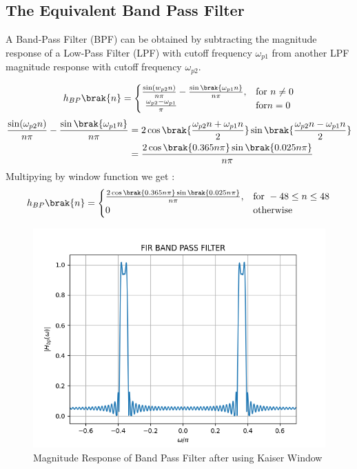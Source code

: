 \documentclass{article}
\begin{document}
\subsection{The Equivalent Band Pass Filter}
A Band-Pass Filter (BPF) can be obtained by subtracting the magnitude response of a Low-Pass Filter (LPF) with cutoff frequency $\omega_{p1}$ from another LPF magnitude response with cutoff frequency $\omega_{p2}$.

\begin{align}
    h_{BP}\brak{n} = 
\begin{cases} 
    \frac{\sin(w_{p2} n)}{n\pi} -\frac{\sin\brak{\omega_{p1}n}}{n\pi},  & \text{for } n\neq 0\\\
    \frac{\omega_{p2}-\omega_{p1}}{\pi} &\text{for} n= 0
\end{cases} \label{eq:h(n)desired_for_LPF}
\end{align}
\begin{align}
     \frac{\sin(\omega_{p2} n)}{n\pi} -\frac{\sin\brak{\omega_{p1}n}}{n\pi} &= 2\cos{\brak{\frac{\omega_{p2}n+\omega_{p1}n}{2}}}\sin{\brak{\frac{\omega_{p2}n-\omega_{p1}n}{2}}}\\
            &= \frac{2\cos{\brak{0.365n\pi}}\sin{\brak{0.025n\pi}}}{n\pi}
\end{align}
Multipying by window function we get :
\begin{align}
    h_{BP}\brak{n} = 
\begin{cases} 
   \frac{2\cos{\brak{0.365n\pi}}\sin{\brak{0.025n\pi}}}{n\pi},  & \text{for } -48\leq n \leq 48 \\
    0 &\text{otherwise}
\end{cases} \label{eq:h(n)desired_for_LPF}
\end{align}

\begin{figure}[H]
\centering
\includegraphics[width=1\columnwidth]{figs/FIR_Bandpass_Filter.png}
\caption{Magnitude Response of Band Pass Filter after using Kaiser Window}
\label{fig:Kaiser_BPF_response}
\end{figure}
\end{document}
